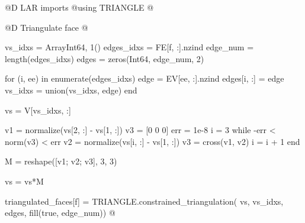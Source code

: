 @D LAR imports
@{using TRIANGLE
@}

@D Triangulate face
@{vs_idxs = Array{Int64, 1}()
edges_idxs = FE[f, :].nzind
edge_num = length(edges_idxs)
edges = zeros(Int64, edge_num, 2)

for (i, ee) in enumerate(edges_idxs)
    edge = EV[ee, :].nzind
    edges[i, :] = edge
    vs_idxs = union(vs_idxs, edge)
end

vs = V[vs_idxs, :]

v1 = normalize(vs[2, :] - vs[1, :])
v3 = [0 0 0]
err = 1e-8
i = 3
while -err < norm(v3) < err
    v2 = normalize(vs[i, :] - vs[1, :])
    v3 = cross(v1, v2)
    i = i + 1
end

M = reshape([v1; v2; v3], 3, 3)

vs = vs*M

triangulated_faces[f] = TRIANGLE.constrained_triangulation(
    vs, vs_idxs, edges, fill(true, edge_num))
@}